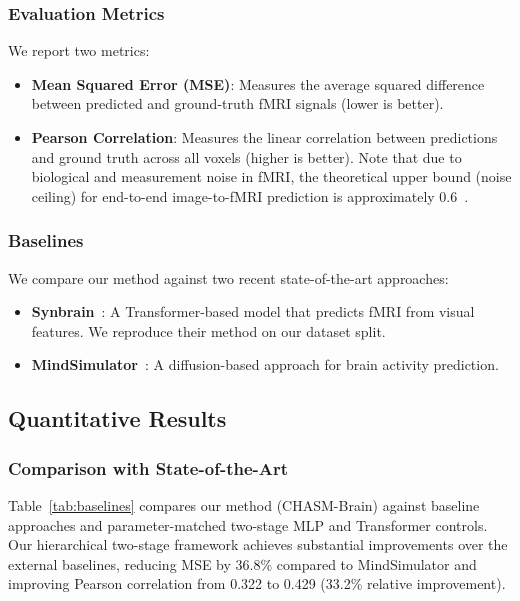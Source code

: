 \subsubsection{Evaluation Metrics}
We report two metrics:
\begin{itemize}
  \item \textbf{Mean Squared Error (MSE)}: Measures the average squared difference between
        predicted and ground-truth fMRI signals (lower is better).
  \item \textbf{Pearson Correlation}: Measures the linear correlation between predictions
        and ground truth across all voxels (higher is better).
        Note that due to biological and measurement noise in fMRI,
        the theoretical upper bound (noise ceiling) for end-to-end image-to-fMRI prediction
        is approximately 0.6~\cite{allen2022massive}.
\end{itemize}

\subsubsection{Baselines}
We compare our method against two recent state-of-the-art approaches:
\begin{itemize}
  \item \textbf{Synbrain}~\cite{synbrain}: A Transformer-based model that predicts fMRI from visual features.
        We reproduce their method on our dataset split.
  \item \textbf{MindSimulator}~\cite{mindsimulator}: A diffusion-based approach for brain activity prediction.
\end{itemize}


\subsection{Quantitative Results}

\subsubsection{Comparison with State-of-the-Art}

Table~\ref{tab:baselines} compares our method (CHASM-Brain) against baseline approaches
and parameter-matched two-stage MLP and Transformer controls.
Our hierarchical two-stage framework achieves substantial improvements over the external baselines,
reducing MSE by 36.8\% compared to MindSimulator and improving Pearson correlation
from 0.322 to 0.429 (33.2\% relative improvement).


